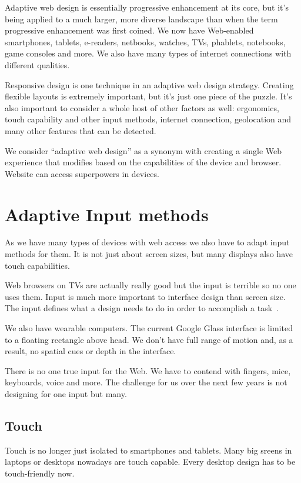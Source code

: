 \documentclass{iitsrc}
\begin{document}
Adaptive web design is essentially progressive enhancement at its core, but it’s being applied to a much larger, more diverse landscape than when the term progressive enhancement was first coined. We now have Web-enabled smartphones, tablets, e-readers, netbooks, watches, TVs, phablets, notebooks, game consoles and more. We also have many types of internet connections with different qualities.

Responsive design is one technique in an adaptive web design strategy. Creating flexible layouts is extremely important, but it’s just one piece of the puzzle. It’s also important to consider a whole host of other factors as well: ergonomics, touch capability and other input methods, internet connection, geolocation and many other features that can be detected.

We consider “adaptive web design” as a synonym with creating a single Web experience that modifies based on the capabilities of the device and browser. Website can access superpowers in devices.


\section{Adaptive Input methods}

As we have many types of devices with web access we also have to adapt input methods for them. It is not just about screen sizes, but many displays also have touch capabilities.

Web browsers on TVs are actually really good but the input is terrible so no one uses them. Input is much more important to interface design than screen size. The input defines what a design needs to do in order to accomplish a task~\cite{adaptiveinput}.

We also have wearable computers. The current Google Glass interface is limited to a floating rectangle above head. We don’t have full range of motion and, as a result, no spatial cues or depth in the interface.

There is no one true input for the Web. We have to contend with fingers, mice, keyboards, voice and more. The challenge for us over the next few years is not designing for one input but many.

\subsection{Touch} %
\label{sub:touch}

Touch is no longer just isolated to smartphones and tablets. Many big sreens in laptops or desktops nowadays are touch capable. Every desktop design has to be touch-friendly now.
\end{document}
